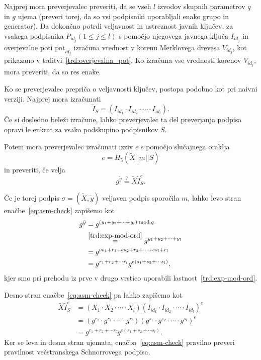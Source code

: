 Najprej mora preverjevalec preveriti, da se vseh $l$ izvodov skupnih parametrov $q$ in $g$ ujema (preveri
torej, da so vsi podpisniki uporabljali enako grupo in generator). Da dokončno potrdi veljavnost in
ustreznost javnih ključev, za vsakega podpisnika $P_{id_j} (1 \le j \le l)$ s pomočjo njegovega javnega
ključa $I_{id_j}$ in overjevalne poti $\text{pot}_{id_j}$ izračuna vrednost v korenu Merklovega drevesa
$V_{id_j}$, kot prikazano v trditvi~\ref{trd:overjevalna_pot}. Ko izračuna vse vrednosti korenov
$V_{id_j}$, mora preveriti, da so res enake.

Ko se preverjevalec prepriča o veljavnosti ključev, postopa podobno kot pri naivni verziji. Najprej
mora izračunati
$$
\tilde{I}_S = (I_{id_1} \cdot I_{id_2} \cdot \cdots \cdot I_{id_l}).
$$
Če si dosledno beleži izračune, lahko preverjevalec ta del preverjanja podpisa opravi le enkrat za
vsako podskupino podpisnikov $S$.

Potem mora preverjevalec izračunati izziv $e$ s pomočjo slučajnega oraklja
$$
e = H_5(\tilde{X} || m || S)
$$
in preveriti, če velja
\begin{equation}
\label{eq:asm-check}
g^{\tilde{y}} \stackrel{?}{=} \tilde{X} \tilde{I}_S^e.
\end{equation}

Če je torej podpis $\sigma = (\tilde{X}, \tilde{y})$ veljaven podpis sporočila $m$, lahko levo stran
enačbe~\eqref{eq:asm-check} zapišemo kot
\begin{align*}
    g^{\tilde{y}} &= g^{(y_1 + y_2 + \cdots + y_l) \bmod q} \\
                  &\stackrel{\ref{trd:exp-mod-ord}}{=} g^{y_1 + y_2 + \cdots + y_l} \\
                  &= g^{e s_1 + r_1 + e s_2 + r_2 + \cdots + e s_l + r_l} \\
                  &= g^{r_1 + r_2 + \cdots r_l} g^{e (s_1 + s_2 + \cdots s_l)},
\end{align*}
kjer smo pri prehodu iz prve v drugo vrstico uporabili lastnost~\ref{trd:exp-mod-ord}.

Desno stran enačbe~\eqref{eq:asm-check} pa lahko zapišemo kot
\begin{align*}
    \tilde{X} \tilde{I}_S^e &= (X_1 \cdot X_2 \cdot \cdots \cdot X_l)
        (I_{id_1} \cdot I_{id_2} \cdot \cdots \cdot I_{id_l})^e \\
    &=(g^{r_1} \cdot g^{r_2} \cdot \cdots \cdot g^{r_l})
        (g^{s_1} \cdot g^{s_2} \cdot \cdots \cdot g^{s_l})^e \\
    &= g^{r_1 + r_2 + \cdots r_l} g^{e (s_1 + s_2 + \cdots s_l)}.
\end{align*}
Ker se leva in desna stran ujemata, enačba~\eqref{eq:asm-check} pravilno preveri pravilnost večstranskega
Schnorrovega podpisa.

